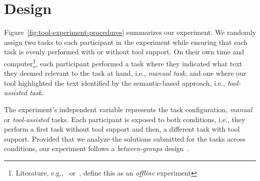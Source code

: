 
\section{Design}
\label{cp6:design}



Figure~\ref{fig:tool-experiment-procedures} summarizes our experiment.
We randomly assign two tasks to each participant in the experiment
while 
ensuring that each task is evenly performed with or without tool support.
On their own time and computer\footnote{Literature, e.g.,~\cite{wohlin2012} or~\cite{DeLucia2012}, define this as an \textit{offline} experiment}, 
each participant performed a task where they indicated 
what text they deemed relevant to the task at hand, i.e., \textit{manual task},
and one where our tool highlighted the text identified by 
the semantic-based approach, i.e., \textit{tool-assisted task}.



The experiment's independent variable represents the task configuration, \textit{manual} or \textit{tool-assisted} tasks. Each participant is exposed to both conditions, i.e., they perform 
a first task without tool support and then, a different task with tool support.
Provided that we analyze the solutions submitted for the tasks across conditions, 
our experiment follows a \textit{between-groups} design~\cite{Lazar2017-cp3, wohlin2012}.


















